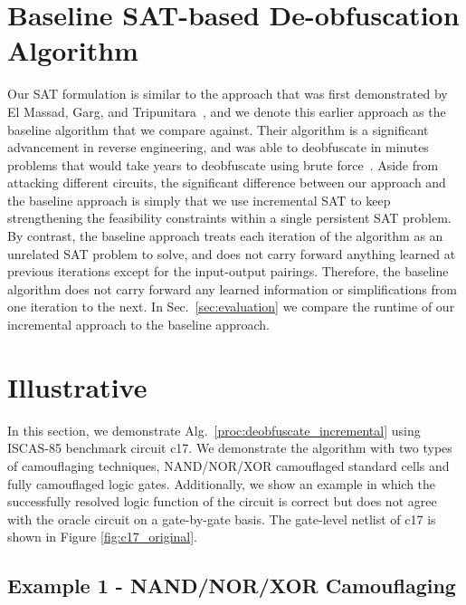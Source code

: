 \documentclass[proposal]{umassthesis}  %
\begin{document}

\section{Baseline SAT-based De-obfuscation Algorithm}
Our SAT formulation is similar to the approach that was first demonstrated by El Massad, Garg, and Tripunitara~\cite{elmassad-15}, and we denote this earlier approach as the baseline algorithm that we compare against. Their algorithm is a significant advancement in reverse engineering, and was able to deobfuscate in minutes problems that would take years to deobfuscate using brute force~\cite{rajendran-13}. Aside from attacking different circuits, the significant difference between our approach and the baseline approach is simply that we use incremental SAT to keep strengthening the feasibility constraints within a single persistent SAT problem. By contrast, the baseline approach treats each iteration of the algorithm as an unrelated SAT problem to solve, and does not carry forward anything learned at previous iterations except for the input-output pairings. Therefore, the baseline algorithm does not carry forward any learned information or simplifications from one iteration to the next. In Sec.~\ref{sec:evaluation} we compare the runtime of our incremental approach to the baseline approach.















\section{Illustrative}
In this section, we demonstrate Alg.~\ref{proc:deobfuscate_incremental} using ISCAS-85 benchmark circuit c17. We demonstrate the algorithm with two types of camouflaging techniques, NAND/NOR/XOR camouflaged standard cells and fully camouflaged logic gates. Additionally, we show an example in which the successfully resolved logic function of the circuit is correct but does not agree with the oracle circuit on a gate-by-gate basis. The gate-level netlist of c17 is shown in Figure \ref{fig:c17_original}.

\subsection{Example 1 - NAND/NOR/XOR Camouflaging}
\end{document}
